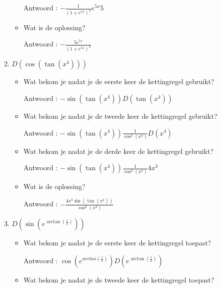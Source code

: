 \begin{enumerate}
\begin{itemize}
		Antwoord : $-\frac{1}{\left( 1+e^{5x}  \right)^2}e^{5x}5$
		
		\item Wat is de oplossing?
		
		Antwoord : $-\frac {5e^{5x}}{\left( 1+e^{5x}  \right)^2}$
		
	\end{itemize}
	
	\item $D \left( \cos \left( \tan \left(  x^4 \right)  \right)  \right)$
	
	\begin{itemize}
		
		\item Wat bekom je nadat je de eerste keer de kettingregel gebruikt?
		
		Antwoord : $-\sin \left( \tan \left(  x^4  \right)  \right)D \left( \tan \left( x^4  \right)  \right)$
		
		\item Wat bekom je nadat je de tweede keer de kettingregel gebruikt?
		
		Antwoord : $-\sin \left( \tan \left(  x^4  \right)  \right)\frac{1}{\cos^2 \left( x^4  \right)}D\left(  x^4 \right)$
		
		\item Wat bekom je nadat je de derde keer de kettingregel gebruikt?
		
		Antwoord :  $-\sin \left( \tan \left(  x^4  \right)  \right)\frac{1}{\cos^2 \left( x^4  \right)}4x^3$
		
		\item Wat is de oplossing?
		
		Antwoord : $-\frac{4x^3\sin \left( \tan \left(  x^4  \right)  \right)}{\cos^2 \left( x^4  \right)}$
		
	\end{itemize}
	
	\item $D \left(  \sin \left(  e^{\arctan \left(  \frac{1}{x}  \right) } \right)  \right)$
	
	\begin{itemize}
		
		\item Wat bekom je nadat je de eerste keer de kettingregel toepast?
		
		Antwoord : $\cos \left(  e^{arctan \left(  \frac{1}{x}  \right) } \right) D \left(  e^{\arctan \left(  \frac{1}{x}  \right) }  \right)$
		
		\item Wat bekom je nadat je de tweede keer de kettingregel toepast?
		

\end{itemize}
\end{enumerate}
